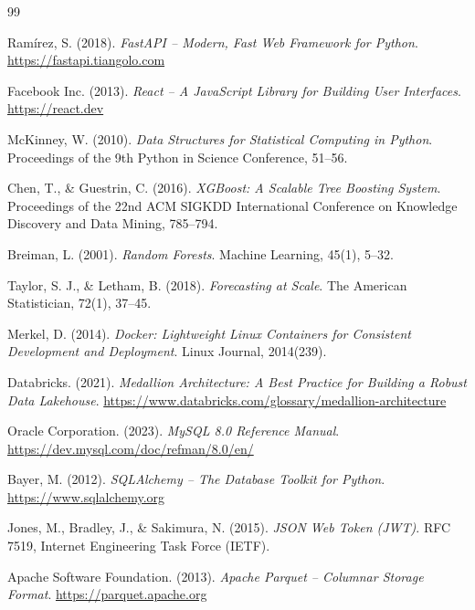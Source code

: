 \documentclass[12pt,a4paper]{report}
\begin{document}
	\begin{thebibliography}{99}
		
		Ramírez, S. (2018). \textit{FastAPI -- Modern, Fast Web Framework for Python}.
		\url{https://fastapi.tiangolo.com}
		
		Facebook Inc. (2013). \textit{React -- A JavaScript Library for Building User Interfaces}.
		\url{https://react.dev}
		
		McKinney, W. (2010). \textit{Data Structures for Statistical Computing in Python}.
		Proceedings of the 9th Python in Science Conference, 51--56.
		
		Chen, T., \& Guestrin, C. (2016). \textit{XGBoost: A Scalable Tree Boosting System}.
		Proceedings of the 22nd ACM SIGKDD International Conference on Knowledge Discovery and Data Mining, 785--794.
		
		Breiman, L. (2001). \textit{Random Forests}.
		Machine Learning, 45(1), 5--32.
		
		Taylor, S. J., \& Letham, B. (2018). \textit{Forecasting at Scale}.
		The American Statistician, 72(1), 37--45.
		
		Merkel, D. (2014). \textit{Docker: Lightweight Linux Containers for Consistent Development and Deployment}.
		Linux Journal, 2014(239).
		
		Databricks. (2021). \textit{Medallion Architecture: A Best Practice for Building a Robust Data Lakehouse}.
		\url{https://www.databricks.com/glossary/medallion-architecture}
		
		Oracle Corporation. (2023). \textit{MySQL 8.0 Reference Manual}.
		\url{https://dev.mysql.com/doc/refman/8.0/en/}
		
		Bayer, M. (2012). \textit{SQLAlchemy -- The Database Toolkit for Python}.
		\url{https://www.sqlalchemy.org}
		
		Jones, M., Bradley, J., \& Sakimura, N. (2015). \textit{JSON Web Token (JWT)}.
		RFC 7519, Internet Engineering Task Force (IETF).
		
		Apache Software Foundation. (2013). \textit{Apache Parquet -- Columnar Storage Format}.
		\url{https://parquet.apache.org}
		

\end{thebibliography}
\end{document}
